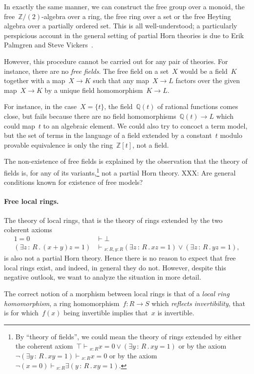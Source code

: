 \documentclass{ws-rv9x6}
\newcommand{\QQ}{\mathbb{Q}}
\newcommand{\ZZ}{\mathbb{Z}}
\renewcommand{\_}{\mathpunct{.}}
\newcommand{\?}{\,{:}\,}
\newcommand{\seq}[1]{\mathrel{\vdash\!\!\!_{#1}}}
\begin{document}
In exactly the same manner, we can construct the free group over a monoid, the
free~$\ZZ/(2)$-algebra over a ring, the free ring over a set or the free
Heyting algebra over a partially ordered set. This is all well-understood; a
particularly perspicious account in the general setting of partial Horn
theories is due to Erik Palmgren and Steve Vickers~\cite{palmgren-vickers:partial-horn}.

However, this procedure cannot be carried out for any pair of theories. For
instance, there are no \emph{free fields}. The free field on a set~$X$ would be
a field~$K$ together with a map~$X \to K$ such that any map~$X \to L$ factors
over the given map~$X \to K$ by a unique field homomorphism~$K \to L$.

For instance, in the case~$X = \{ t \}$, the field~$\QQ(t)$ of rational
functions comes close, but fails because there are no field homomorphisms~$\QQ(t)
\to L$ which could map~$t$ to an algebraic element. We could also try to
concoct a term model, but the set of terms in the language of a field extended
by a constant~$t$ modulo provable equivalence is only the ring~$\ZZ[t]$, not a
field.

The non-existence of free fields is explained by the observation that the
theory of fields is, for any of its variants,\footnote{By ``theory of fields'',
we could mean the theory of rings extended by either the coherent axiom~$\top
\seq{x:R} x = 0 \vee (\exists y\?R\_ xy = 1)$ or by the axiom~$\neg(\exists
y\?R\_ xy = 1) \seq{x:R} x = 0$ or by the axiom~$\neg(x = 0) \seq{x:R} \exists
(y\?R\_ xy = 1)$.} not a partial Horn theory.
XXX: Are general conditions known for existence of free models?

\paragraph{Free local rings.} The theory of local rings, that is the theory of
rings extended by the two coherent axioms
\begin{align*}
  1 = 0 &\vdash \bot \\
  (\exists z\?R\_ (x+y)z = 1) &\seq{x:R,y:R} (\exists z\?R\_ xz = 1) \vee
  (\exists z\?R\_ yz = 1),
\end{align*}
is also not a partial Horn theory. Hence there is no reason to expect that free
local rings exist, and indeed, in general they do not. However, despite this
negative outlook, we want to analyze the situation in more detail.

The correct notion of a morphism between local rings is that of a \emph{local
ring homomorphism}, a ring homomorphism~$f : R \to S$ which \emph{reflects
invertibility}, that is for which~$f(x)$ being invertible implies that~$x$ is
invertible.
\end{document}
